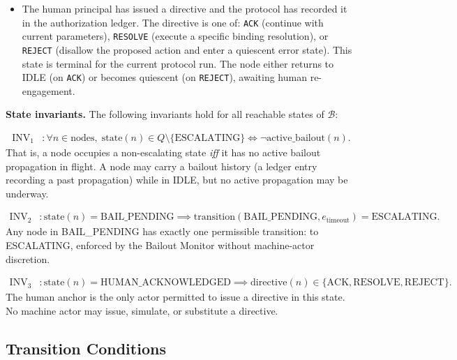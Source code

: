 \begin{itemize}
\item[\textbf{RESOLVED.}] The human principal has issued a directive and the protocol has recorded it in the authorization ledger. The directive is one of: \texttt{ACK} (continue with current parameters), \texttt{RESOLVE} (execute a specific binding resolution), or \texttt{REJECT} (disallow the proposed action and enter a quiescent error state). This state is terminal for the current protocol run. The node either returns to IDLE (on \texttt{ACK}) or becomes quiescent (on \texttt{REJECT}), awaiting human re-engagement.
\end{itemize}

\medskip\noindent\textbf{State invariants.} The following invariants hold for all reachable states of $\mathcal{B}$:

\begin{align}
\text{INV}_1 &: \forall n \in \text{nodes},\; \text{state}(n) \in Q \setminus \{\text{ESCALATING}\} \iff \neg\text{active\_bailout}(n). \tag{INV-1}
\end{align}
That is, a node occupies a non-escalating state \emph{iff} it has no active bailout propagation in flight. A node may carry a bailout history (a ledger entry recording a past propagation) while in IDLE, but no active propagation may be underway.

\begin{align}
\text{INV}_2 &: \text{state}(n) = \text{BAIL\_PENDING} \implies \text{transition}(\text{BAIL\_PENDING}, e_{\text{timeout}}) = \text{ESCALATING}. \tag{INV-2}
\end{align}
Any node in BAIL\_PENDING has exactly one permissible transition: to ESCALATING, enforced by the Bailout Monitor without machine-actor discretion.

\begin{align}
\text{INV}_3 &: \text{state}(n) = \text{HUMAN\_ACKNOWLEDGED} \implies \text{directive}(n) \in \{\text{ACK}, \text{RESOLVE}, \text{REJECT}\}. \tag{INV-3}
\end{align}
The human anchor is the only actor permitted to issue a directive in this state. No machine actor may issue, simulate, or substitute a directive.

\subsection{Transition Conditions}\label{sec:transitions}

